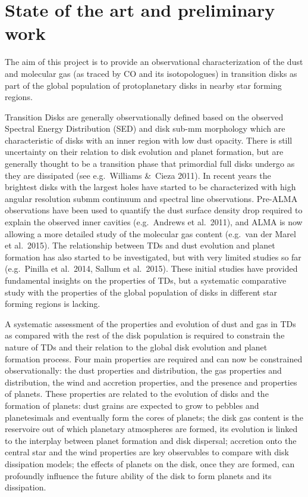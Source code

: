 \documentclass[10pt,fleqn,twoside]{article}
\begin{document}
\section{State of the art and preliminary work}
\renewcommand{\leftmark}{\sc State of the Art and preliminary work}
\label{s_state_art}

The aim of this project is to provide an observational characterization of the dust and molecular gas
(as traced by CO and its isotopologues) in transition disks as part of the global population of protoplanetary disks in nearby star forming regions.  

Transition Disks are generally observationally defined based on the observed Spectral Energy
Distribution (SED) and disk sub-mm morphology which are characteristic of disks with an inner region
with low dust opacity. There is still uncertainty on their relation 
to disk evolution and planet formation, but are generally thought to be a transition phase that
primordial full disks undergo as they are dissipated (see e.g.\ Williams \&\ Cieza 2011). In recent 
years the brightest disks with the largest holes have started to be characterized with high angular resolution submm continuum and spectral line observations. 
Pre-ALMA observations have been used to quantify the dust surface density drop required to 
explain the observed inner cavities (e.g.\ Andrews et al.~2011), and ALMA is now allowing a more 
detailed study of the molecular gas content (e.g.\ van der Marel et al.~2015). 
The relationship between TDs and dust evolution and planet formation has also started to be investigated,
but with very limited studies so far (e.g.\ Pinilla et al.~2014, Sallum et al.~2015).
These initial studies have provided fundamental insights on the properties of TDs, but a 
systematic comparative study with the properties of the global population of disks in different 
star forming regions is lacking.

A systematic assessment of the properties and evolution of dust and gas in TDs as compared with the rest of the disk population is required to constrain the nature of TDs and their relation to the global disk evolution and planet formation process. Four main properties are required and can now be constrained 
observationally: the dust properties and distribution, the gas properties and distribution, the wind and accretion properties, and the presence and properties of planets. These properties are related to the evolution of disks and the formation of planets: dust grains are expected to grow to pebbles and planetesimals and eventually form the cores of planets; the disk gas content is the reservoire out of which planetary atmospheres are formed, its evolution is linked to the interplay between planet formation and disk dispersal; accretion onto the central star and the wind properties are key observables to compare with disk dissipation models; the effects of planets on the disk, once they are formed, can profoundly influence the future ability of the disk to form planets and its dissipation.
\end{document}

